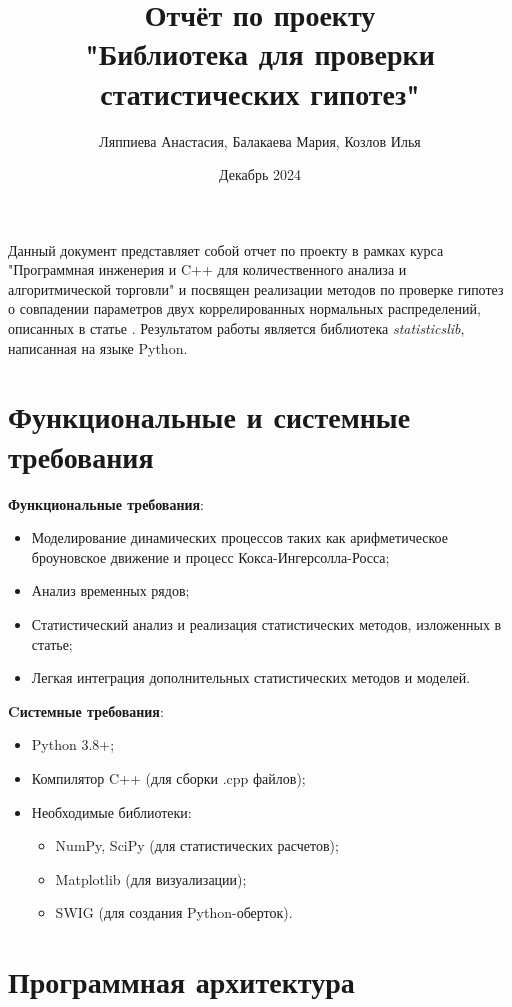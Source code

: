\documentclass{article}
\title{Отчёт по проекту \\ "Библиотека для проверки статистических гипотез"}
\author{Ляппиева Анастасия, Балакаева Мария, Козлов Илья}
\date{Декабрь 2024}
\begin{document}
\maketitle

Данный документ представляет собой отчет по проекту в рамках курса 
"Программная инженерия и C++ для количественного анализа и алгоритмической 
торговли" и посвящен реализации методов по проверке гипотез о совпадении параметров 
двух коррелированных нормальных распределений, описанных в статье \cite{Cl2019}. 
Результатом работы является библиотека \textit{statisticslib}, написанная на 
языке Python.

\section{Функциональные и системные требования}

\textbf{Функциональные требования}:
\begin{itemize}
    \item Моделирование динамических процессов таких как арифметическое 
    броуновское движение и процесс Кокса-Ингерсолла-Росса;
    \item Анализ временных рядов;
    \item Статистический анализ и реализация статистических методов, 
    изложенных в статье;
    \item Легкая интеграция дополнительных статистических методов и моделей.
\end{itemize}

\textbf{Cистемные требования}:
\begin{itemize}
    \item Python 3.8+;
    \item Компилятор C++ (для сборки .cpp файлов);
    \item Необходимые библиотеки:
    \begin{itemize}
    \item NumPy, SciPy (для статистических расчетов);
    \item Matplotlib (для визуализации);
    \item SWIG (для создания Python-оберток).
    \end{itemize}
\end{itemize}

\section{Программная архитектура}
\end{document}
